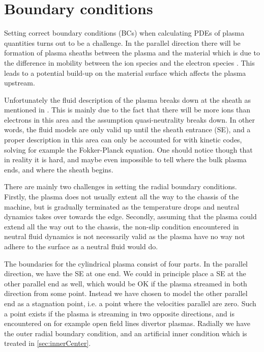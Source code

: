 \section{Boundary conditions}
\label{sec:BCs}
%
Setting correct boundary conditions (BCs) when calculating PDEs of plasma quantities turns out to be a challenge.
In the parallel direction there will be formation of plasma sheaths between the plasma and the material which is due to the difference in mobility between the ion species and the electron species \cite{Stangeby2000book}.
This leads to a potential build-up on the material surface which affects the plasma upstream.

Unfortunately the fluid description of the plasma breaks down at the sheath as mentioned in \cite{Loizu2012a}.
This is mainly due to the fact that there will be more ions than electrons in this area and the assumption quasi-neutrality breaks down.
In other words, the fluid models are only valid up until the sheath entrance (SE), and a proper description in this area can only be accounted for with kinetic codes, solving for example the Fokker-Planck equation.
One should notice though that in reality it is hard, and maybe even impossible to tell where the bulk plasma ends, and where the sheath begins.

There are mainly two challenges in setting the radial boundary conditions.
Firstly, the plasma does not usually extent all the way to the chassis of the machine, but is gradually terminated as the temperature drops and neutral dynamics takes over towards the edge.
Secondly, assuming that the plasma could extend all the way out to the chassis, the non-slip condition encountered in neutral fluid dynamics \cite{Kundu2010book} is not necessarily valid as the plasma have no way not adhere to the surface as a neutral fluid would do.

The boundaries for the cylindrical plasma consist of four parts.
In the parallel direction, we have the SE at one end.
We could in principle place a SE at the other parallel end as well, which would be OK if the plasma streamed in both direction from some point.
Instead we have chosen to model the other parallel end as a stagnation point, i.e. a point where the velocities parallel are zero.
Such a point exists if the plasma is streaming in two opposite directions, and is encountered on for example open field lines  divertor plasmas.
Radially we have the outer radial boundary condition, and an artificial inner condition which is treated in \cref{sec:innerCenter}.

